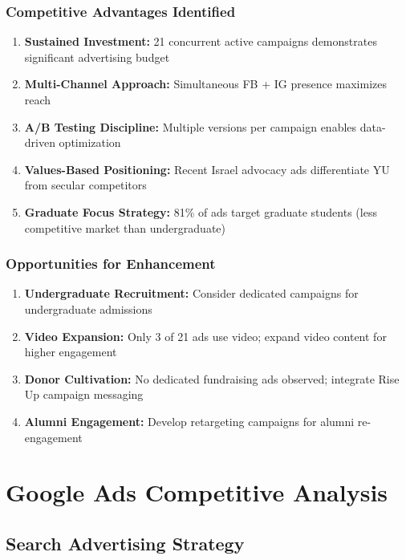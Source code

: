 \documentclass[12pt,letterpaper]{article}
\begin{document}
\subsubsection{Competitive Advantages Identified}

\begin{enumerate}[leftmargin=*]
    \item \textbf{Sustained Investment:} 21 concurrent active campaigns demonstrates significant advertising budget
    \item \textbf{Multi-Channel Approach:} Simultaneous FB + IG presence maximizes reach
    \item \textbf{A/B Testing Discipline:} Multiple versions per campaign enables data-driven optimization
    \item \textbf{Values-Based Positioning:} Recent Israel advocacy ads differentiate YU from secular competitors
    \item \textbf{Graduate Focus Strategy:} 81\% of ads target graduate students (less competitive market than undergraduate)
\end{enumerate}

\subsubsection{Opportunities for Enhancement}

\begin{enumerate}[leftmargin=*]
    \item \textbf{Undergraduate Recruitment:} Consider dedicated campaigns for undergraduate admissions
    \item \textbf{Video Expansion:} Only 3 of 21 ads use video; expand video content for higher engagement
    \item \textbf{Donor Cultivation:} No dedicated fundraising ads observed; integrate Rise Up campaign messaging
    \item \textbf{Alumni Engagement:} Develop retargeting campaigns for alumni re-engagement
\end{enumerate}

\section{Google Ads Competitive Analysis}

\subsection{Search Advertising Strategy}
\end{document}
